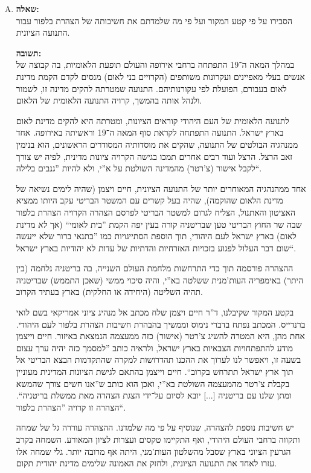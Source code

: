 \documentclass[a4paper]{article}
\newcommand\hl[1]   {#1}
\begin{document}
		\begin{enumerate}[A.]
			\item \textbf{שאלה: }\\
			הסבירו על פי קטע המקור ועל פי מה שלמדתם את חשיבותה של הצהרת בלפור עבור התנועה הציונית. 
			
			\textbf{תשובה: }\\
			במהלך המאה ה־19 התפתחה ברחבי אירופה והעולם תופעת ה\hl{לאומיות}, בה קבוצה של אנשים בעלי מאפיינים ועקרונות משותפים (הקרויים \hl{בני לאום}) מנסים לקדם הקמת \hl{מדינת לאום} בעבורם, הפועלת לפי עקורנותיהם. התנועה שמטרתה להקים מדינה זו, לשמור ולנהל אותה בהמשך, קרויה \hl{התנועה הלאומית} של הלאום. 
			
			לתנועה הלאומית של העם היהודי קוראים \hl{הציונות}, ומטרתה היא להקים מדינת לאום בארץ ישראל. התנועה התפתחה לקראת סוף המאה ה־19 וראשיתה באירופה. אחד ממנהגיה הבולטים של התנועה, שהקים את מוסדותיה המסודרים הראשונים, הוא \hl{בנימין זאב הרצל}. הרצל ועוד רבים אחרים תמכו בגישה הקרויה \hl{ציונות מדינית}, לפיה יש צורך לקבל אישור (צ'רטר) מהמדינה השולטת על א''י, ולא להיות ''גנבים בלילה``.
			
			אחד ממהנהגיה המאוחרים יותר של התנועה הציונית, חיים ויצמן (שהיה לימים נשיאה של מדינת הלאום שהוקמה), שהיה בעל קשרים עם \hl{המשטר הבריטי} עקב היותו ממציא האציטון והאתנול, הצליח לגרום למשטר הבריטי לפרסם הצהרה הקרויה \hl{הצהרת בלפור} שבה שר החוץ הבריטי טען שבריטניה קורה בעין יפה הקמת ''בית לאומי`` (אך \textit{לא} מדינת לאום) בארץ ישראל לעם היהודי, תוך הוספת הסתייגויות כמו ''בתנאי ברור שלא ייעשה שום דבר העלול לפגוע בזכויות האזרחיות והדתיות של עדות לא יהודיות בארץ ישראל``. 
			
			ההצהרה פורסמה תוך כדי התרחשות \hl{מלחמת העולם השנייה}, בה בריטניה נלחמה (בין היתר) באימפריה  העות'מנית ששלטה בא''י, והיה סיכוי ממשי (שאכן התממש) שבריטניה תהיה השליטה (היחידה או החלקית) בארץ בעתיד הקרוב. 
			
			בקטע המקור שקיבלנו, ד''ר חיים ויצמן שלח מכתב אל מנהיג ציוני אמריקאי בשם לואי ברנדייס. המכתב נפתח בדברי נימוס וממשיך בהבהרת חשיבות הצהרת בלפור לעם היהודי. אחת מהן, היא המטרה להשיג צ'רטר (אישור) כזה ממעצמה הנמצאת באיזור. חיים וייצמן מודע להתפתחויות הצבאיות בארץ ישראל, ולראיה כותב ''למסמך כזה יהיה ערך עצום בשעה זו, ויאפשר לנו לערוך את ההכנו תהדרושות למקרה שהתקדמות הבצא הבריטי אל תוך ארץ ישראל תתרחש בקרוב``. חיים וייצמן בהתאם לגישת הציונות המדינית מעוניין בקבלת צ'רטר מהמעצמה השולטת בא''י, ואכן הוא כותב ש''אנו חשים צורך שהמשא ומתן שלנו עם בריטניה [...] יובא לסיום על־ידי הצגת הצהרה מאת ממשלת בריטניה``. הצהרה זו קרויה ''הצהרת בלפור``. 
			
			יש חשיבות נוספת להצהרה, שנוסיף על פי מה שלמדנו. ההצהרה עוררה גל של שמחה ותקווה ברחבי העולם היהודי, ואף התקיימו טקסים ועצרות לציון המאורע. השמחה בקרב הגרעין הציוני בארץ שסבל מהשלטון העות'מני, היתה אף מרובה יותר. גלי שמחה אלו עזרו לאחד את התנועה הציונית, ולחזק את האמונה שלימים מדינת יהודית תקום. 
			

\end{enumerate}
\end{document}
